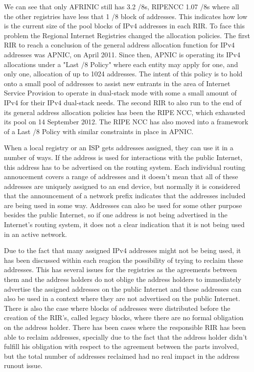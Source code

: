 \documentclass[11pt,a4paper]{scrreprt}
\begin{document}
We can see that only AFRINIC still has 3.2 /8s, RIPENCC 1.07 /8s where all the other registries have less that 1 /8 block of addresses. This indicates how low is the current size of the pool blocks of IPv4 addresses in each RIR. To face this problem the Regional Internet Registries changed the allocation policies. The first RIR to reach a conclusion of the general address allocation function for IPv4 addresses was APNIC, on April 2011. Since then, APNIC is operating its IPv4
allocations under a "Last /8 Policy" \cite{APNIC_last8} where each entity may apply for one, and only one, allocation of up to 1024 addresses. The intent of this policy is to hold onto a small pool of addresses to assist new entrants in the area of Internet Service Provision to operate in dual-stack mode with some a small amount of IPv4 for their IPv4 dual-stack needs. The second RIR to also run to the end of its general address allocation policies has been the RIPE NCC, which exhausted its pool on 14 September 2012. The RIPE NCC has also moved into a framework of a Last /8 Policy \cite{RIPE_last8} with similar constraints in place in APNIC. 

When a local registry or an ISP gets addresses assigned, they can use it in a number of ways. If the address is used for interactions with the public Internet, this address has to be advertised on the routing system. Each individual routing annoucement covers a range of addresses and it doesn't mean that all of these addresses are uniquely assigned to an end device, but normally it is considered that the announcement of a network prefix indicates that the addresses included are being used in some way. Addresses can also be used for some other purpose besides the public Internet, so if one address is not being advertised in the Internet's routing system, it does not a clear indication that it is not being used in an active network.

Due to the fact that many assigned IPv4 addresses might not be being used, it has been discussed within each reagion the possibility of trying to reclaim these addresses. This has several issues for the registries as the agreements between them and the address holders do not oblige the address holders to immediately advertise the assigned addresses on the public Internet and these addresses can also be used in a context where they are not advertised on the public Internet. There is also the case where blocks of addresses were distributed before the creation of the RIR's, called legacy blocks, where there are no formal obligation on the address holder. There has been cases where the responsible RIR has been able to reclaim addresses, specially due to the fact that the address holder didn't fulfill his obligation with respect to the agreement between the parts involved, but the total number of addresses reclaimed had no real impact in the address runout issue.
\end{document}
